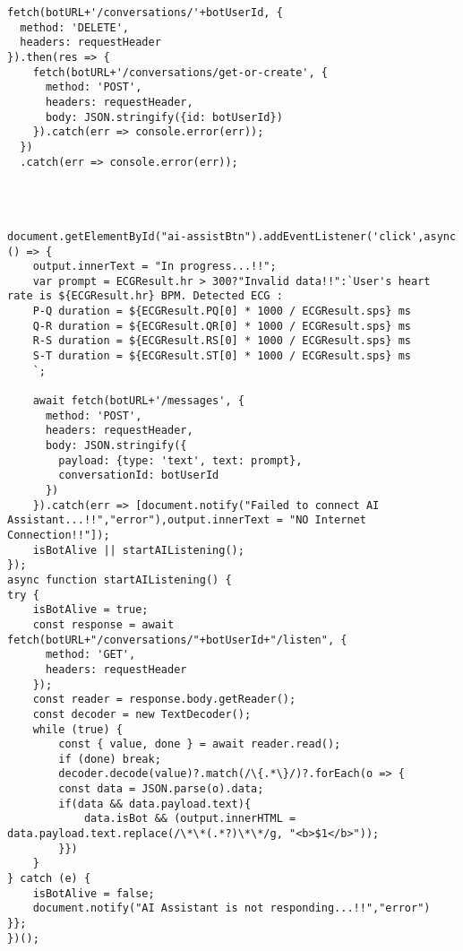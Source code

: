 \begin{lstlisting}[style=htmlcssjs]
fetch(botURL+'/conversations/'+botUserId, {
  method: 'DELETE',
  headers: requestHeader
}).then(res => {
    fetch(botURL+'/conversations/get-or-create', {
      method: 'POST',
      headers: requestHeader,
      body: JSON.stringify({id: botUserId})
    }).catch(err => console.error(err));
  })
  .catch(err => console.error(err));




document.getElementById("ai-assistBtn").addEventListener('click',async () => {
    output.innerText = "In progress...!!";
    var prompt = ECGResult.hr > 300?"Invalid data!!":`User's heart rate is ${ECGResult.hr} BPM. Detected ECG :
    P-Q duration = ${ECGResult.PQ[0] * 1000 / ECGResult.sps} ms
    Q-R duration = ${ECGResult.QR[0] * 1000 / ECGResult.sps} ms
    R-S duration = ${ECGResult.RS[0] * 1000 / ECGResult.sps} ms
    S-T duration = ${ECGResult.ST[0] * 1000 / ECGResult.sps} ms
    `;

    await fetch(botURL+'/messages', {
      method: 'POST',
      headers: requestHeader,
      body: JSON.stringify({
        payload: {type: 'text', text: prompt},
        conversationId: botUserId
      })
    }).catch(err => [document.notify("Failed to connect AI Assistant...!!","error"),output.innerText = "NO Internet Connection!!"]);
    isBotAlive || startAIListening();
});
async function startAIListening() {
try {
    isBotAlive = true;
    const response = await fetch(botURL+"/conversations/"+botUserId+"/listen", {
      method: 'GET',
      headers: requestHeader
    });
    const reader = response.body.getReader();
    const decoder = new TextDecoder();
    while (true) {
        const { value, done } = await reader.read();
        if (done) break;
        decoder.decode(value)?.match(/\{.*\}/)?.forEach(o => {
        const data = JSON.parse(o).data;
        if(data && data.payload.text){
            data.isBot && (output.innerHTML = data.payload.text.replace(/\*\*(.*?)\*\*/g, "<b>$1</b>"));
        }})
    }
} catch (e) {
    isBotAlive = false;
    document.notify("AI Assistant is not responding...!!","error")
}};
})();
\end{lstlisting}